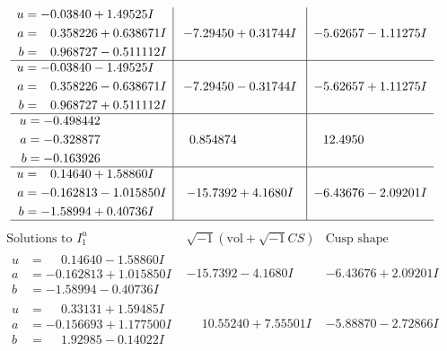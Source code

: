 \documentclass[1p]{elsarticle_modified}
\theoremstyle{definition}
\newcommand{\I}{\sqrt{-1}}
\begin{document}
$$\begin{array}{c|c|c}
\begin{aligned}
u &= -0.03840 + 1.49525 I \\
a &= \phantom{-}0.358226 + 0.638671 I \\
b &= \phantom{-}0.968727 - 0.511112 I\end{aligned}
 & -7.29450 + 0.31744 I & -5.62657 - 1.11275 I \\ \hline\begin{aligned}
u &= -0.03840 - 1.49525 I \\
a &= \phantom{-}0.358226 - 0.638671 I \\
b &= \phantom{-}0.968727 + 0.511112 I\end{aligned}
 & -7.29450 - 0.31744 I & -5.62657 + 1.11275 I \\ \hline\begin{aligned}
u &= -0.498442\phantom{ +0.000000I} \\
a &= -0.328877\phantom{ +0.000000I} \\
b &= -0.163926\phantom{ +0.000000I}\end{aligned}
 & \phantom{-}0.854874\phantom{ +0.000000I} & \phantom{-}12.4950\phantom{ +0.000000I} \\ \hline\begin{aligned}
u &= \phantom{-}0.14640 + 1.58860 I \\
a &= -0.162813 - 1.015850 I \\
b &= -1.58994 + 0.40736 I\end{aligned}
 & -15.7392 + 4.1680 I & -6.43676 - 2.09201 I\\
 \hline 
 \end{array}$$\newpage$$\begin{array}{c|c|c}  
\text{Solutions to }I^u_{1}& \I (\text{vol} + \sqrt{-1}CS) & \text{Cusp shape}\\
 \hline 
\begin{aligned}
u &= \phantom{-}0.14640 - 1.58860 I \\
a &= -0.162813 + 1.015850 I \\
b &= -1.58994 - 0.40736 I\end{aligned}
 & -15.7392 - 4.1680 I & -6.43676 + 2.09201 I \\ \hline\begin{aligned}
u &= \phantom{-}0.33131 + 1.59485 I \\
a &= -0.156693 + 1.177500 I \\
b &= \phantom{-}1.92985 - 0.14022 I\end{aligned}
 & \phantom{-}10.55240 + 7.55501 I & -5.88870 - 2.72866 I \\ \hline\begin{aligned}

\end{aligned}
\end{array}$$
\end{document}
